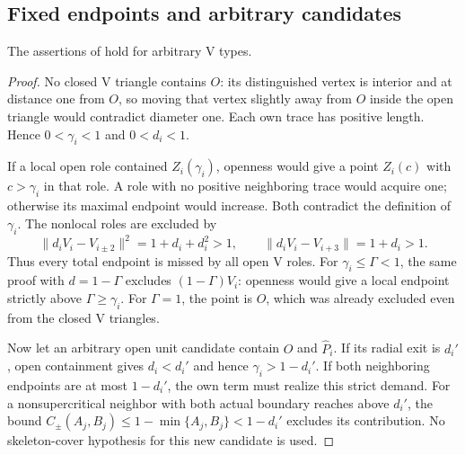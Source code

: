 \subsection{Fixed endpoints and arbitrary candidates}

\begin{lemma}
\label{lem:appendix-fixed-total-endpoint}
The assertions of  hold for arbitrary
V types.
\end{lemma}
\begin{proof}
No closed V triangle contains $O$: its distinguished vertex is interior
and at distance one from $O$, so moving that vertex slightly away from $O$
inside the open triangle would contradict diameter one. Each own trace has
positive length. Hence $0<\gamma_i<1$ and $0<d_i<1$.

If a local open role contained $Z_i(\gamma_i)$, openness would give a point
$Z_i(c)$ with $c>\gamma_i$ in that role. A role with no positive neighboring
trace would acquire one; otherwise its maximal endpoint would increase.
Both contradict the definition of $\gamma_i$. The nonlocal roles are
excluded by
\[
 \|d_iV_i-V_{i\pm2}\|^2=1+d_i+d_i^2>1,
 \qquad \|d_iV_i-V_{i+3}\|=1+d_i>1.
\]
Thus every total endpoint is missed by all open V roles. For
$\gamma_i\le\Gamma<1$, the same proof with $d=1-\Gamma$ excludes
$(1-\Gamma)V_i$: openness would give a local endpoint strictly above
$\Gamma\ge\gamma_i$. For $\Gamma=1$, the point is $O$, which was already
excluded even from the closed V triangles.

Now let an arbitrary open unit candidate contain $O$ and $\widehat P_i$.
If its radial exit is $d_i'$, open containment gives $d_i<d_i'$ and hence
$\gamma_i>1-d_i'$. If both neighboring endpoints are at most $1-d_i'$,
the own term must realize this strict demand. For a nonsupercritical
neighbor with both actual boundary reaches above $d_i'$, the bound
$C_\pm(A_j,B_j)\le1-\min\{A_j,B_j\}<1-d_i'$ excludes its contribution.
No skeleton-cover hypothesis for this new candidate is used.
\end{proof}


